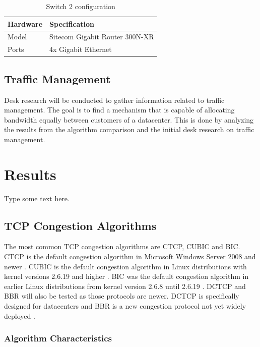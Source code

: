 \documentclass{article}
\begin{document}
		\begin{table}[H]
			\centering
			\caption{Switch 2 configuration}
			\begin{tabular}[H]{ | l | l | }
			\hline
			\textbf{Hardware} & \textbf{Specification} \\
			\hline  Model & Sitecom Gigabit Router 300N-XR\\
			\hline  Ports & 4x Gigabit Ethernet\\
			\hline
			\end{tabular}
			\label{table:spec3}
		\end{table}

	\subsection{Traffic Management}
	Desk research will be conducted to gather information related to traffic management. The goal is to find a mechanism that is capable of allocating bandwidth equally between customers of a datacenter. This is done by analyzing the results from the algorithm comparison and the initial desk research on traffic management. 

\section{Results}
Type some text here.

	\subsection{TCP Congestion Algorithms}
	The most common TCP congestion algorithms are CTCP, CUBIC and BIC. CTCP is the default congestion algorithm in Microsoft Windows Server 2008 and newer \cite{cubic-kernel-version}. CUBIC is the default congestion algorithm in Linux distributions with kernel versions 2.6.19 and higher \cite{cubic-kernel-version}. BIC was the default congestion algorithm in earlier Linux distributions from kernel version 2.6.8 until 2.6.19 \cite{bic-kernel-version} \cite{cubic-kernel-version}. DCTCP and BBR will also be tested as those protocols are newer. DCTCP is specifically designed for datacenters \cite{dctcp-congestion} and BBR is a new congestion protocol not yet widely deployed \cite{bbr-congestion}.
	
		\subsubsection{Algorithm Characteristics}
		
\end{document}
